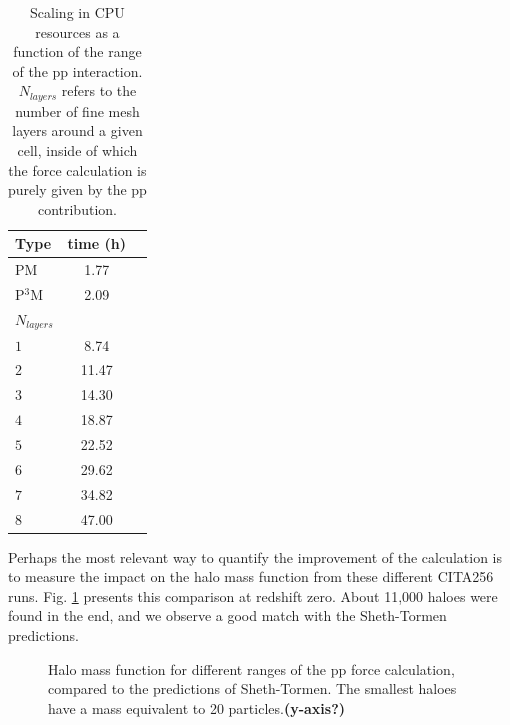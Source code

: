 \begin{table}
\begin{center}
\caption{Scaling in {\small CPU} resources as a function of the range of the pp interaction.
$N_{layers}$ refers to the number of fine mesh layers around a given cell, inside of which the force calculation
is purely given by the pp contribution. }
\begin{tabular}{|l|c|c|}
\hline 
             Type         & time (h)   \\
                  \hline
PM                         & 1.77 \\
P$^{3}$M             & 2.09 \\
\hline
$N_{layers}$       &          \\
\hline
 $1$ & 8.74 \\
 $2$ & 11.47\\
 $3$ & 14.30 \\
 $4$ & 18.87\\
 $5$ & 22.52\\
 $6$ & 29.62\\
 $7$ & 34.82\\
 $8$ & 47.00\\
 

\hline \hline
\end{tabular}
\label{table:cpu_pp_ext}
\end{center}
\end{table}

Perhaps the most relevant way to quantify the improvement of the calculation is to measure the impact on the halo mass function from these different CITA256 runs. Fig. \ref{fig:MassFunction_extpp} presents this comparison at redshift zero. About 11,000 haloes were found in the end, and we observe a good match with the Sheth-Tormen predictions. 

\begin{figure}
  \begin{center}
  \caption{ Halo mass function for different ranges of the pp force calculation, compared to the predictions of Sheth-Tormen. 
  The smallest haloes have a mass equivalent to 20 particles.{\bf (y-axis?)}}
    \label{fig:MassFunction_extpp}
  \end{center}
\end{figure}

